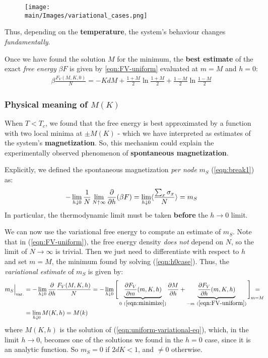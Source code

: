 \documentclass[../../main.tex]{subfiles}
\begin{document}
\begin{figure}[H]
    \centering
    \texttt{[image: \\main/Images/variational\_cases.png]}
    \caption{} %
    \label{fig:variational_cases}
\end{figure}

Thus, depending on the \textbf{temperature}, the system's behaviour changes \textit{fundamentally}.  

\medskip

Once we have found the solution $M$ for the minimum, the \textbf{best estimate} of the exact \textit{free energy} $\beta F$ is given by \ref{eqn:FV-uniform} evaluated at $m=M$ and $h=0$:
\begin{align}\label{eqn:FV-energy-h0}
    \beta \frac{F_V(M,K,0)}{N} = -K d M + \frac{1+M}{2} \ln \frac{1+M}{2} + \frac{1-M}{2} \ln \frac{1-M}{2}     
\end{align}

\subsubsection{Physical meaning of $M(K)$}
When $T < T_c$, we found that the free energy is best approximated by a function with two local minima at $\pm M(K)$ - which we have interpreted as estimates of the system's \textbf{magnetization}. So, this mechanism could explain the experimentally observed phenomenon of \textbf{spontaneous magnetization}.

\medskip

Explicitly, we defined the spontaneous magnetization \textit{per node}  $m_S$ (\ref{eqn:break1}) as:
\begin{align}\label{eqn:ms}
    -\lim_{h \downarrow 0} \frac{1}{N} \lim_{N \uparrow \infty} \pdv{h} (\beta F) = \lim_{h \downarrow 0} \langle \frac{\sum_x \sigma_x}{N}  \rangle = m_S
\end{align}
In particular, the thermodynamic limit must be taken \textbf{before} the $h \to 0$ limit.

We can now use the variational free energy to compute an estimate of $m_S$. Note that in (\ref{eqn:FV-uniform}), the free energy density \textit{does not} depend on $N$, so the limit of $N \to \infty$ is trivial. Then we just need to differentiate with respect to $h$ and set $m = M$, the minimum found by solving (\ref{eqn:h0case}). Thus, the \textit{variational estimate} of $m_S$ is given by:
\begin{align}\nonumber
    m_S\Big|_{\mathrm{var.}} &= -\lim_{h \downarrow 0} \pdv{h} \frac{F_V(M, K, h)}{N} = -\lim_{h \downarrow 0} \Bigg[\underbrace{{\pdv{F_V}{m}}(m, K, h)}_{0\ (\ref{eqn:minimize})} \pdv{M}{h} + \underbrace{{\pdv{F_V}{h}}(m, K, h)}_{-m\ (\ref{eqn:FV-uniform})} \Bigg]_{\quad\mathclap{m = M}} \mathclap{=} \\
    &= \lim_{h \downarrow 0} M(K,h) = M(k)
    \label{eqn:variational-spontaneous-magnetization}
\end{align} 
where $M(K,h)$ is the solution of (\ref{eqn:uniform-variational-eq}), which, in the limit $h \to 0$, becomes one of the solutions we found in the $h=0$ case, since it is an analytic function. So $m_S = 0$ if $2dK < 1$, and $\neq 0$ otherwise.
\end{document}
